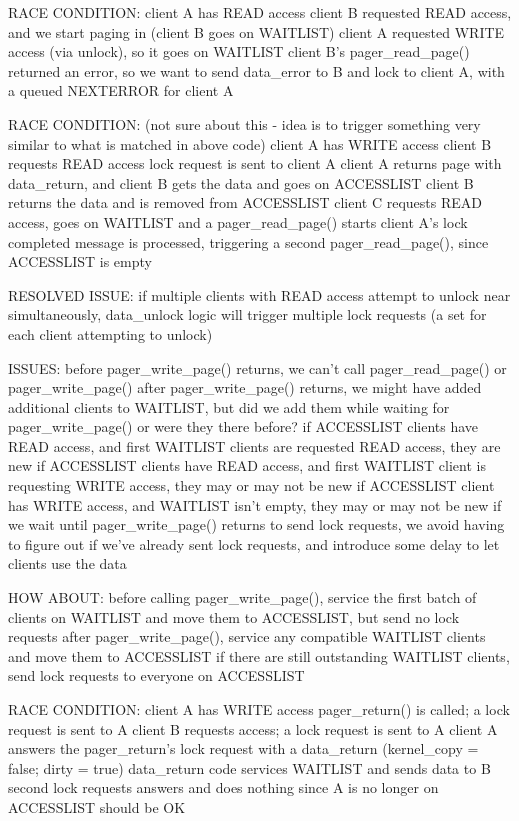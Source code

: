 \documentclass{article}
\begin{document}
RACE CONDITION:
  client A has READ access
  client B requested READ access, and we start paging in (client B goes on WAITLIST)
  client A requested WRITE access (via unlock), so it goes on WAITLIST
  client B's pager_read_page() returned an error, so we want to send data_error to B
     and lock to client A, with a queued NEXTERROR for client A


RACE CONDITION: (not sure about this - idea is to trigger something very similar to what is matched in above code)
  client A has WRITE access
  client B requests READ access
  lock request is sent to client A
  client A returns page with data_return, and client B gets the data and goes on ACCESSLIST
  client B returns the data and is removed from ACCESSLIST
  client C requests READ access, goes on WAITLIST and a pager_read_page() starts
  client A's lock completed message is processed, triggering a second pager_read_page(), since ACCESSLIST is empty

RESOLVED ISSUE: if multiple clients with READ access attempt to unlock near simultaneously,
  data_unlock logic will trigger multiple lock requests (a set for each client attempting to unlock)


ISSUES:
  before pager_write_page() returns, we can't call pager_read_page() or pager_write_page()
  after pager_write_page() returns, we might have added additional clients to WAITLIST,
    but did we add them while waiting for pager_write_page() or were they there before?
    if ACCESSLIST clients have READ access, and first WAITLIST clients are requested READ access, they are new
    if ACCESSLIST clients have READ access, and first WAITLIST client is requesting WRITE access,
      they may or may not be new
    if ACCESSLIST client has WRITE access, and WAITLIST isn't empty,
      they may or may not be new
    if we wait until pager_write_page() returns to send lock requests, we avoid having to figure out
      if we've already sent lock requests, and introduce some delay to let clients use the data

HOW ABOUT:
  before calling pager_write_page(), service the first batch of clients on WAITLIST
     and move them to ACCESSLIST, but send no lock requests
  after pager_write_page(), service any compatible WAITLIST clients and move them to ACCESSLIST
  if there are still outstanding WAITLIST clients, send lock requests to everyone on ACCESSLIST

RACE CONDITION:
  client A has WRITE access
  pager_return() is called; a lock request is sent to A
  client B requests access; a lock request is sent to A
  client A answers the pager_return's lock request with a data_return (kernel_copy = false; dirty = true)
  data_return code services WAITLIST and sends data to B
  second lock requests answers and does nothing since A is no longer on ACCESSLIST
  should be OK
\end{document}
